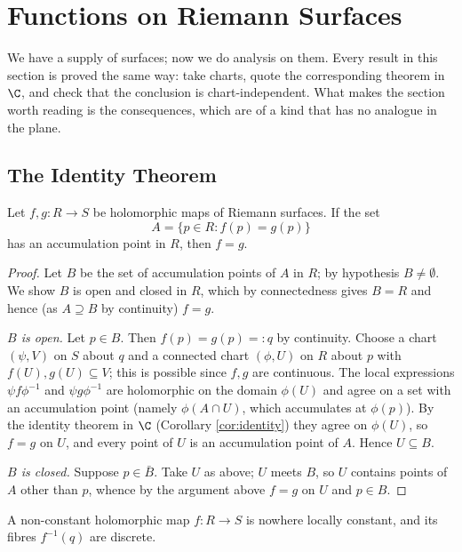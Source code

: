 \section{Functions on Riemann Surfaces}

We have a supply of surfaces; now we do analysis on them. Every result in this section is
proved the same way: take charts, quote the corresponding theorem in $\C$, and check that
the conclusion is chart-independent. What makes the section worth reading is the
consequences, which are of a kind that has no analogue in the plane.

\subsection{The Identity Theorem}

\begin{theorem}\label{thm:identityRS}
	Let $f, g : R \to S$ be holomorphic maps of Riemann surfaces. If the set
	$$
	A = \{p \in R : f(p) = g(p)\}
	$$
	has an accumulation point in $R$, then $f = g$.
\end{theorem}

\begin{proof}
	Let $B$ be the set of accumulation points of $A$ in $R$; by hypothesis $B \neq \emptyset$.
	We show $B$ is open and closed in $R$, which by connectedness gives $B = R$ and hence
	(as $A \supseteq B$ by continuity) $f = g$.

	\emph{$B$ is open.} Let $p \in B$. Then $f(p) = g(p) =: q$ by continuity. Choose a chart
	$(\psi, V)$ on $S$ about $q$ and a connected chart $(\phi, U)$ on $R$ about $p$ with
	$f(U), g(U) \subseteq V$; this is possible since $f, g$ are continuous. The local
	expressions $\psi f \phi^{-1}$ and $\psi g\phi^{-1}$ are holomorphic on the domain
	$\phi(U)$ and agree on a set with an accumulation point (namely $\phi(A \cap U)$, which
	accumulates at $\phi(p)$). By the identity theorem in $\C$ (Corollary \ref{cor:identity})
	they agree on $\phi(U)$, so $f = g$ on $U$, and every point of $U$ is an accumulation
	point of $A$. Hence $U \subseteq B$.

	\emph{$B$ is closed.} Suppose $p \in \bar B$. Take $U$ as above; $U$ meets $B$, so $U$
	contains points of $A$ other than $p$, whence by the argument above $f = g$ on $U$ and
	$p \in B$.
\end{proof}

\begin{corollary}\label{cor:notlocallyconstant}
	A non-constant holomorphic map $f : R \to S$ is nowhere locally constant, and its
	fibres $f^{-1}(q)$ are discrete.
\end{corollary}


